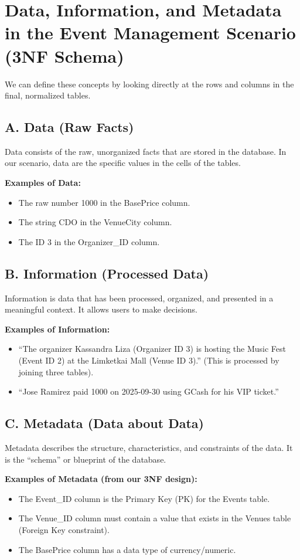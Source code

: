 \documentclass[12pt]{article}
\begin{document}
\section*{Data, Information, and Metadata in the Event Management Scenario (3NF Schema)}

We can define these concepts by looking directly at the rows and columns in the final, normalized tables.

\subsection*{A. Data (Raw Facts)}
Data consists of the raw, unorganized facts that are stored in the database. In our scenario, data are the specific values in the cells of the tables.

\textbf{Examples of Data:}
\begin{itemize}[noitemsep]
    \item The raw number 1000 in the BasePrice column.
    \item The string CDO in the VenueCity column.
    \item The ID 3 in the Organizer\_ID column.
\end{itemize}

\subsection*{B. Information (Processed Data)}
Information is data that has been processed, organized, and presented in a meaningful context. It allows users to make decisions.

\textbf{Examples of Information:}
\begin{itemize}[noitemsep]
    \item ``The organizer Kassandra Liza (Organizer ID 3) is hosting the Music Fest (Event ID 2) at the Limketkai Mall (Venue ID 3).'' (This is processed by joining three tables).
    \item ``Jose Ramirez paid 1000 on 2025-09-30 using GCash for his VIP ticket.''
\end{itemize}

\subsection*{C. Metadata (Data about Data)}
Metadata describes the structure, characteristics, and constraints of the data. It is the ``schema'' or blueprint of the database.

\textbf{Examples of Metadata (from our 3NF design):}
\begin{itemize}[noitemsep]
    \item The Event\_ID column is the Primary Key (PK) for the Events table.
    \item The Venue\_ID column must contain a value that exists in the Venues table (Foreign Key constraint).
    \item The BasePrice column has a data type of currency/numeric.
\end{itemize}
\end{document}
